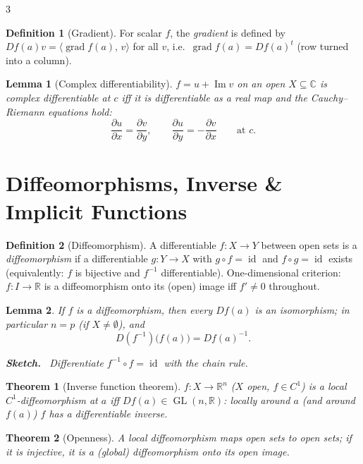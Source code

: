 \documentclass[10pt,a4paper,landscape]{article}
\theoremstyle{definition}
\newtheorem{defn}{Definition}[section]
\theoremstyle{plain}
\newtheorem{thm}{Theorem}[section]
\newtheorem{lem}{Lemma}[section]
\theoremstyle{remark}
\newcommand{\R}{\mathbb{R}}
\newcommand{\C}{\mathbb{C}}
\newcommand{\im}{\operatorname{Im}}
\newcommand{\id}{\operatorname{id}}
\newcommand{\comp}{\circ}
\DeclareMathOperator{\grad}{grad}
\DeclareMathOperator{\GL}{GL}
\newcommand{\ip}[2]{\langle #1,\, #2 \rangle}
\newenvironment{proofsketch}{%
  \par\small\color{exgray}\textbf{Sketch.}\ }%
  {\par}
\begin{document}
\begin{multicols*}{3}
\begin{defn}[Gradient]
For scalar $f$, the \emph{gradient} is defined by $Df(a)v = \ip{\grad f(a)}{v}$ for all $v$, i.e.\ $\grad f(a) = Df(a)^t$ (row turned into a column).
\end{defn}

\begin{lem}[Complex differentiability]
$f = u + \im v$ on an open $X \subseteq \C$ is complex differentiable at $c$ iff it is differentiable as a real map and the \emph{Cauchy--Riemann equations} hold:
\[
\frac{\partial u}{\partial x} = \frac{\partial v}{\partial y}, \qquad \frac{\partial u}{\partial y} = -\frac{\partial v}{\partial x} \qquad \text{at } c.
\]
\end{lem}

\section{Diffeomorphisms, Inverse \& Implicit Functions}

\begin{defn}[Diffeomorphism]
A differentiable $f: X \to Y$ between open sets is a \emph{diffeomorphism} if a differentiable $g: Y \to X$ with $g \comp f = \id$ and $f \comp g = \id$ exists (equivalently: $f$ is bijective and $f^{-1}$ differentiable). One-dimensional criterion: $f: I \to \R$ is a diffeomorphism onto its (open) image iff $f' \neq 0$ throughout.
\end{defn}

\begin{lem}
If $f$ is a diffeomorphism, then every $Df(a)$ is an isomorphism; in particular $n = p$ (if $X \neq \emptyset$), and
\[
D(f^{-1})\bigl(f(a)\bigr) = Df(a)^{-1}.
\]
\begin{proofsketch}
Differentiate $f^{-1} \comp f = \id$ with the chain rule.
\end{proofsketch}
\end{lem}

\begin{thm}[Inverse function theorem]
$f: X \to \R^n$ ($X$ open, $f \in C^1$) is a local $C^1$-diffeomorphism at $a$ iff $Df(a) \in \GL(n,\R)$: locally around $a$ (and around $f(a)$) $f$ has a differentiable inverse.
\end{thm}

\begin{thm}[Openness]
A local diffeomorphism maps open sets to open sets; if it is injective, it is a (global) diffeomorphism onto its open image.
\end{thm}


\end{multicols*}
\end{document}
